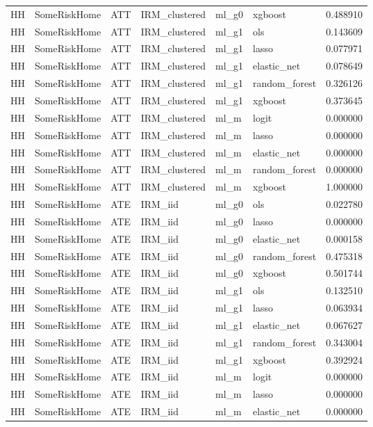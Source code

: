 \begin{longtable}{llllllr}
HH & SomeRiskHome & ATT & IRM\_clustered & ml\_g0 & xgboost & 0.488910 \\
HH & SomeRiskHome & ATT & IRM\_clustered & ml\_g1 & ols & 0.143609 \\
HH & SomeRiskHome & ATT & IRM\_clustered & ml\_g1 & lasso & 0.077971 \\
HH & SomeRiskHome & ATT & IRM\_clustered & ml\_g1 & elastic\_net & 0.078649 \\
HH & SomeRiskHome & ATT & IRM\_clustered & ml\_g1 & random\_forest & 0.326126 \\
HH & SomeRiskHome & ATT & IRM\_clustered & ml\_g1 & xgboost & 0.373645 \\
HH & SomeRiskHome & ATT & IRM\_clustered & ml\_m & logit & 0.000000 \\
HH & SomeRiskHome & ATT & IRM\_clustered & ml\_m & lasso & 0.000000 \\
HH & SomeRiskHome & ATT & IRM\_clustered & ml\_m & elastic\_net & 0.000000 \\
HH & SomeRiskHome & ATT & IRM\_clustered & ml\_m & random\_forest & 0.000000 \\
HH & SomeRiskHome & ATT & IRM\_clustered & ml\_m & xgboost & 1.000000 \\
HH & SomeRiskHome & ATE & IRM\_iid & ml\_g0 & ols & 0.022780 \\
HH & SomeRiskHome & ATE & IRM\_iid & ml\_g0 & lasso & 0.000000 \\
HH & SomeRiskHome & ATE & IRM\_iid & ml\_g0 & elastic\_net & 0.000158 \\
HH & SomeRiskHome & ATE & IRM\_iid & ml\_g0 & random\_forest & 0.475318 \\
HH & SomeRiskHome & ATE & IRM\_iid & ml\_g0 & xgboost & 0.501744 \\
HH & SomeRiskHome & ATE & IRM\_iid & ml\_g1 & ols & 0.132510 \\
HH & SomeRiskHome & ATE & IRM\_iid & ml\_g1 & lasso & 0.063934 \\
HH & SomeRiskHome & ATE & IRM\_iid & ml\_g1 & elastic\_net & 0.067627 \\
HH & SomeRiskHome & ATE & IRM\_iid & ml\_g1 & random\_forest & 0.343004 \\
HH & SomeRiskHome & ATE & IRM\_iid & ml\_g1 & xgboost & 0.392924 \\
HH & SomeRiskHome & ATE & IRM\_iid & ml\_m & logit & 0.000000 \\
HH & SomeRiskHome & ATE & IRM\_iid & ml\_m & lasso & 0.000000 \\
HH & SomeRiskHome & ATE & IRM\_iid & ml\_m & elastic\_net & 0.000000 \\

\end{longtable}
